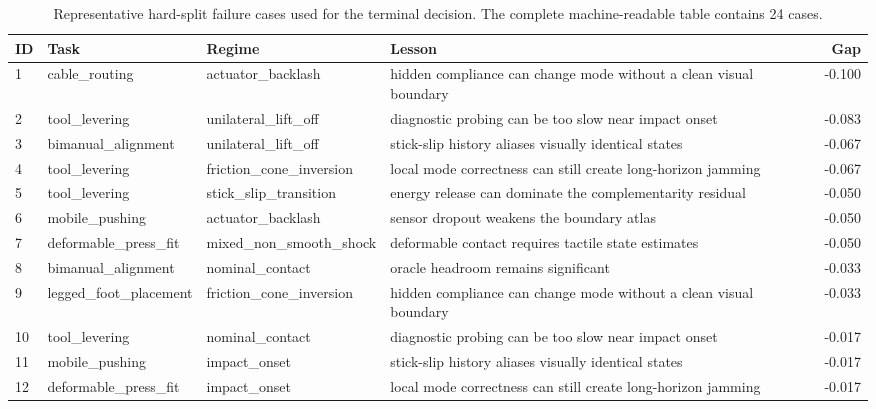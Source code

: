 \begin{table}[t]
\centering
\caption{Representative hard-split failure cases used for the terminal decision. The complete machine-readable table contains 24 cases.}
\scriptsize
\begin{tabular}{llllr}
\toprule
ID & Task & Regime & Lesson & Gap \\
\midrule
1 & cable\_routing & actuator\_backlash & hidden compliance can change mode without a clean visual boundary & -0.100 \\
2 & tool\_levering & unilateral\_lift\_off & diagnostic probing can be too slow near impact onset & -0.083 \\
3 & bimanual\_alignment & unilateral\_lift\_off & stick-slip history aliases visually identical states & -0.067 \\
4 & tool\_levering & friction\_cone\_inversion & local mode correctness can still create long-horizon jamming & -0.067 \\
5 & tool\_levering & stick\_slip\_transition & energy release can dominate the complementarity residual & -0.050 \\
6 & mobile\_pushing & actuator\_backlash & sensor dropout weakens the boundary atlas & -0.050 \\
7 & deformable\_press\_fit & mixed\_non\_smooth\_shock & deformable contact requires tactile state estimates & -0.050 \\
8 & bimanual\_alignment & nominal\_contact & oracle headroom remains significant & -0.033 \\
9 & legged\_foot\_placement & friction\_cone\_inversion & hidden compliance can change mode without a clean visual boundary & -0.033 \\
10 & tool\_levering & nominal\_contact & diagnostic probing can be too slow near impact onset & -0.017 \\
11 & mobile\_pushing & impact\_onset & stick-slip history aliases visually identical states & -0.017 \\
12 & deformable\_press\_fit & impact\_onset & local mode correctness can still create long-horizon jamming & -0.017 \\
\bottomrule
\end{tabular}
\end{table}
